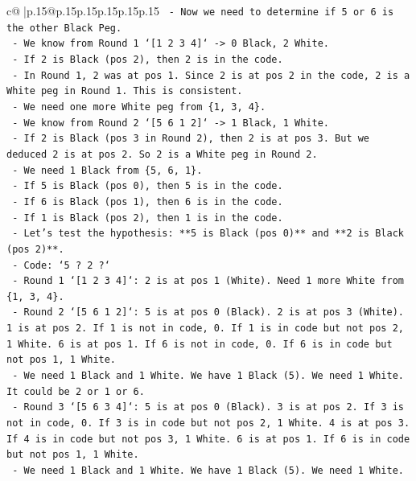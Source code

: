\documentclass{article}
\begin{document}
{\begin{supertabular}{c@{$\;$}|p{.15\linewidth}@{}p{.15\linewidth}p{.15\linewidth}p{.15\linewidth}p{.15\linewidth}p{.15\linewidth}}
{{{\texttt{        {-} Now we need to determine if 5 or 6 is the other Black Peg.} \\
\texttt{        {-} We know from Round 1 `{[}1 2 3 4{]}` {-}> 0 Black, 2 White.} \\
\texttt{            {-} If 2 is Black (pos 2), then 2 is in the code.} \\
\texttt{            {-} In Round 1, 2 was at pos 1. Since 2 is at pos 2 in the code, 2 is a White peg in Round 1. This is consistent.} \\
\texttt{            {-} We need one more White peg from \{1, 3, 4\}.} \\
\texttt{        {-} We know from Round 2 `{[}5 6 1 2{]}` {-}> 1 Black, 1 White.} \\
\texttt{            {-} If 2 is Black (pos 3 in Round 2), then 2 is at pos 3. But we deduced 2 is at pos 2. So 2 is a White peg in Round 2.} \\
\texttt{            {-} We need 1 Black from \{5, 6, 1\}.} \\
\texttt{            {-} If 5 is Black (pos 0), then 5 is in the code.} \\
\texttt{            {-} If 6 is Black (pos 1), then 6 is in the code.} \\
\texttt{            {-} If 1 is Black (pos 2), then 1 is in the code.} \\
\texttt{        {-} Let's test the hypothesis: **5 is Black (pos 0)** and **2 is Black (pos 2)**.} \\
\texttt{            {-} Code: `5 ? 2 ?`} \\
\texttt{            {-} Round 1 `{[}1 2 3 4{]}`: 2 is at pos 1 (White). Need 1 more White from \{1, 3, 4\}.} \\
\texttt{            {-} Round 2 `{[}5 6 1 2{]}`: 5 is at pos 0 (Black). 2 is at pos 3 (White). 1 is at pos 2. If 1 is not in code, 0. If 1 is in code but not pos 2, 1 White. 6 is at pos 1. If 6 is not in code, 0. If 6 is in code but not pos 1, 1 White.} \\
\texttt{            {-} We need 1 Black and 1 White. We have 1 Black (5). We need 1 White. It could be 2 or 1 or 6.} \\
\texttt{            {-} Round 3 `{[}5 6 3 4{]}`: 5 is at pos 0 (Black). 3 is at pos 2. If 3 is not in code, 0. If 3 is in code but not pos 2, 1 White. 4 is at pos 3. If 4 is in code but not pos 3, 1 White. 6 is at pos 1. If 6 is in code but not pos 1, 1 White.} \\
\texttt{            {-} We need 1 Black and 1 White. We have 1 Black (5). We need 1 White.} \\
}}}
\end{supertabular}}
\end{document}
